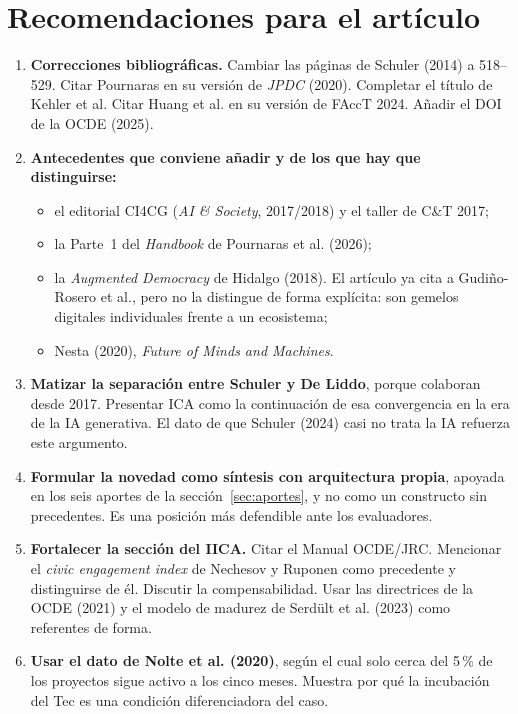 \documentclass[11pt,a4paper]{article}
\begin{document}
\section{Recomendaciones para el artículo}
\begin{enumerate}
  \item \textbf{Correcciones bibliográficas.} Cambiar las páginas de Schuler (2014) a 518--529. Citar Pournaras en su versión de \emph{JPDC} (2020). Completar el título de Kehler et al. Citar Huang et al. en su versión de FAccT 2024. Añadir el DOI de la OCDE (2025).
  \item \textbf{Antecedentes que conviene añadir y de los que hay que distinguirse:}
  \begin{itemize}
    \item el editorial CI4CG (\emph{AI \& Society}, 2017/2018) y el taller de C\&T 2017;
    \item la Parte~1 del \emph{Handbook} de Pournaras et al. (2026);
    \item la \emph{Augmented Democracy} de Hidalgo (2018). El artículo ya cita a Gudiño-Rosero et al., pero no la distingue de forma explícita: son gemelos digitales individuales frente a un ecosistema;
    \item Nesta (2020), \emph{Future of Minds and Machines}.
  \end{itemize}
  \item \textbf{Matizar la separación entre Schuler y De Liddo}, porque colaboran desde 2017. Presentar ICA como la continuación de esa convergencia en la era de la IA generativa. El dato de que Schuler (2024) casi no trata la IA refuerza este argumento.
  \item \textbf{Formular la novedad como síntesis con arquitectura propia}, apoyada en los seis aportes de la sección~\ref{sec:aportes}, y no como un constructo sin precedentes. Es una posición más defendible ante los evaluadores.
  \item \textbf{Fortalecer la sección del IICA.} Citar el Manual OCDE/JRC. Mencionar el \emph{civic engagement index} de Nechesov y Ruponen como precedente y distinguirse de él. Discutir la compensabilidad. Usar las directrices de la OCDE (2021) y el modelo de madurez de Serdült et al. (2023) como referentes de forma.
  \item \textbf{Usar el dato de Nolte et al. (2020)}, según el cual solo cerca del 5\,\% de los proyectos sigue activo a los cinco meses. Muestra por qué la incubación del Tec es una condición diferenciadora del caso.
\end{enumerate}
\end{document}
